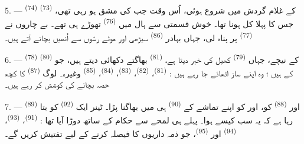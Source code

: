 5. ---  \textsuperscript{(74)} 
\textsuperscript{(73)} کے غلام گردش میں شروع ہوئی، اُس وقت جب
 کی مشق ہو رہی تھی، جس کا پہلا  کل ہونا
تھا۔ خوش قسمتی سے ہال میں  \textsuperscript{(76)} تھوڑے
ہی تھے۔ بے چاروں نے  \textsuperscript{(77)} پر پناہ لی،
جہاں بہادر  \textsuperscript{(86)} سیڑھی اور
موٹے رسّوں سے اُنھیں بچانے آتے ہیں۔

6. ---  \textsuperscript{(78)} کے نیچے، جہاں
 \textsuperscript{(79)} کھیل کی خبر دیتا ہے،
 \textsuperscript{(81)} بھاگتے دکھائی دیتے ہیں، جو
 \textsuperscript{(80)} کے ہیں ؛ وہ اپنے ساز اٹھائے
جا رہے ہیں :  \textsuperscript{(81)}، 
\textsuperscript{(82)}،  \textsuperscript{(83)}،
 \textsuperscript{(84)}، 
\textsuperscript{(85)} وغیرہ۔ لوگ 
\textsuperscript{(87)} کا کچھ حصہ بچانے کی کوشش کر رہے ہیں۔

7. ---  \textsuperscript{(89)} اور
 \textsuperscript{(88)} کو،  اور
 کو اپنے تماشے کے 
\textsuperscript{(90)} ہی میں بھاگنا پڑا۔ ٹینر ایک 
\textsuperscript{(92)} کو بتا رہا ہے کہ یہ سب کیسے ہوا۔
 پہلے ہی لمحے سے حکام کے ساتھ دوڑا آیا تھا :
 \textsuperscript{(91)}، 
\textsuperscript{(93)}،  \textsuperscript{(94)} اور
 \textsuperscript{(95)}، جو ذمہ داریوں کا فیصلہ
کرنے کے لیے تفتیش کریں گے۔

\VUsaut{6.0mm}
\VUfilet{22mm}
